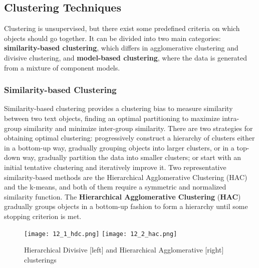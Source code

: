 \documentclass{article}
\begin{document}
\subsection{Clustering Techniques}
Clustering is unsupervised, but there exist some predefined criteria on which objects should go together.
It can be divided into two main categories: \textbf{similarity-based clustering}, which differs in agglomerative clustering and divisive clustering, and \textbf{model-based clustering}, where the data is generated from a mixture of component models.
\subsubsection{Similarity-based Clustering}
Similarity-based clustering provides a clustering bias to measure similarity between two text objects, finding an optimal partitioning to maximize intra-group similarity and minimize inter-group similarity. There are two strategies for obtaining optimal clustering: progressively construct a hierarchy of clusters either in a bottom-up way, gradually grouping objects into larger clusters, or in a top-down way, gradually partition the data into smaller clusters; or start with an initial tentative clustering and iteratively improve it.
Two representative similarity-based methods are the Hierarchical Agglomerative Clustering (HAC) and the k-means, and both of them require a symmetric and normalized similarity function.
The \textbf{Hierarchical Agglomerative Clustering} (\textbf{HAC}) gradually groups objects in a bottom-up fashion to form a hierarchy until some stopping criterion is met.
\begin{figure}[H]
    \centering
    \texttt{[image: 12\_1\_hdc.png]}
    \texttt{[image: 12\_2\_hac.png]}
    \caption{Hierarchical Divisive [left] and Hierarchical Agglomerative [right] clusterings}
\end{figure}
\end{document}
